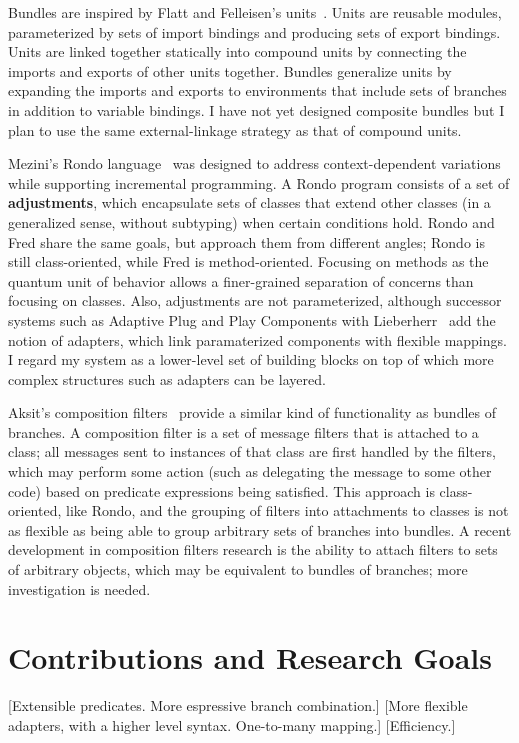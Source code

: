 \documentclass{article}
\newcommand{\defn}[1]{\textbf{#1}}
\begin{document}
Bundles are inspired by Flatt and Felleisen's units~\cite{units}.
Units are reusable modules, parameterized by sets of import bindings
and producing sets of export bindings.  Units are linked together
statically into compound units by connecting the imports and exports
of other units together.  Bundles generalize units by expanding the
imports and exports to environments that include sets of branches in
addition to variable bindings.  I have not yet designed composite
bundles but I plan to use the same external-linkage strategy as that
of compound units.

Mezini's Rondo language~\cite{Rondo} was designed to address
context-dependent variations while supporting incremental programming.
A Rondo program consists of a set of \defn{adjustments}, which
encapsulate sets of classes that extend other classes (in a
generalized sense, without subtyping) when certain conditions hold.
Rondo and Fred share the same goals, but approach them from different
angles; Rondo is still class-oriented, while Fred is method-oriented.
Focusing on methods as the quantum unit of behavior allows a
finer-grained separation of concerns than focusing on classes.  Also,
adjustments are not parameterized, although successor systems such as
Adaptive Plug and Play Components with Lieberherr~\cite{APPC} add the
notion of adapters, which link paramaterized components with flexible
mappings.  I regard my system as a lower-level set of building blocks
on top of which more complex structures such as adapters can be layered.

Aksit's composition filters~\cite{composition-filters} provide a
similar kind of functionality as bundles of branches.  A composition
filter is a set of message filters that is attached to a class; all
messages sent to instances of that class are first handled by the
filters, which may perform some action (such as delegating the message
to some other code) based on predicate expressions being satisfied.
This approach is class-oriented, like Rondo, and the grouping of
filters into attachments to classes is not as flexible as being able
to group arbitrary sets of branches into bundles.  A recent
development in composition filters research is the ability to attach
filters to sets of arbitrary objects, which may be equivalent to
bundles of branches; more investigation is needed.

\section{Contributions and Research Goals}
\label{section:contributions}

[Extensible predicates.  More espressive branch combination.]
[More flexible adapters, with a higher level syntax.  One-to-many mapping.]
[Efficiency.]



\end{document}
